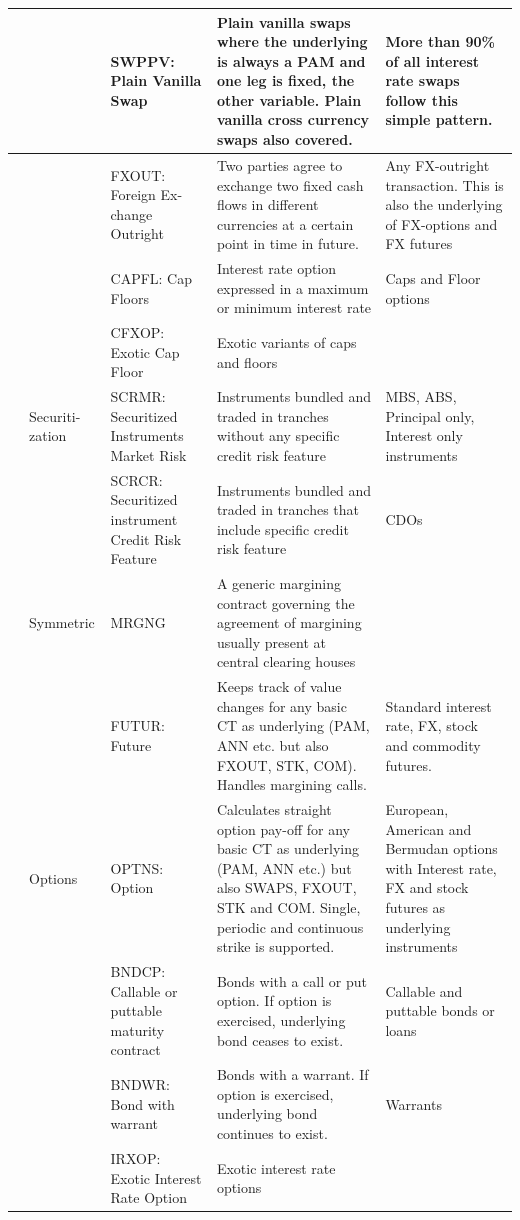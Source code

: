 \documentclass[9pt,oneside]{amsart}
\begin{document}
\begin{longtable}{| p{}p{}p{}p{}p{} |}
	\hline 
	 & & SWPPV: Plain Vanilla Swap & Plain vanilla swaps where the underlying is always a PAM and one leg is fixed, the other variable. Plain vanilla cross currency swaps also covered. & More than 90\%  of all interest rate swaps follow this simple pattern. \\
	\hline 
	 & & FXOUT: Foreign Ex-change Outright & Two parties agree to exchange two fixed cash flows in different currencies at a certain point in time in future. & Any FX-outright transaction. This is also the underlying of FX-options and FX futures \\
	\hline 
	 & & CAPFL: Cap Floors & Interest rate option expressed in a maximum or minimum interest rate & Caps and Floor options \\
	\hline 
	 & & CFXOP: Exotic Cap Floor & Exotic variants of caps and floors & \\
	\hline 
	 & Securiti-zation & SCRMR: Securitized Instruments Market Risk & Instruments bundled and traded in tranches without any specific credit risk feature & MBS, ABS, Principal only, Interest only instruments \\
	\hline 
	 & & SCRCR: Securitized instrument Credit Risk Feature & Instruments bundled and traded in tranches that include specific credit risk feature & CDOs \\
	\hline 
	 & Symmetric & MRGNG & A generic margining contract governing the agreement of margining usually present at central clearing houses & \\
	\hline 
	 & & FUTUR: Future & Keeps track of value changes for any basic CT as underlying (PAM, ANN etc. but also FXOUT, STK, COM). Handles margining calls. & Standard interest rate, FX, stock and commodity futures. \\
	\hline 
	 & Options & OPTNS: Option & Calculates straight option pay-off for any basic CT as underlying (PAM, ANN etc.) but also SWAPS, FXOUT, STK and COM. Single, periodic and continuous strike is supported. & European, American and Bermudan options with Interest rate, FX and stock futures as underlying instruments \\
	\hline 
	 & & BNDCP: Callable or puttable maturity contract & Bonds with a call or put option. If option is exercised, underlying bond ceases to exist. & Callable and puttable bonds or loans \\
	\hline 
	 & & BNDWR: Bond with warrant & Bonds with a warrant. If option is exercised, underlying bond continues to exist. & Warrants \\
	\hline 
	 & & IRXOP: Exotic Interest Rate Option & Exotic interest rate options & \\

\end{longtable}
\end{document}
